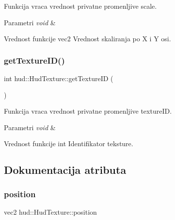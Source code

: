 Funkcija vraca vrednost privatne promenljive scale. 


\begin{DoxyParams}{Parametri}
{\em void} & \\
\hline
\end{DoxyParams}
\begin{DoxyReturn}{Vrednost funkcije}
vec2 Vrednost skaliranja po X i Y osi. 
\end{DoxyReturn}
\mbox{\label{classhud_1_1HudTexture_a2ac36167c1f0e18fdc9ea125fb909074}} 
\subsubsection{\texorpdfstring{get\+Texture\+I\+D()}{getTextureID()}}
{\footnotesize\ttfamily int hud\+::\+Hud\+Texture\+::get\+Texture\+ID (\begin{DoxyParamCaption}{ }\end{DoxyParamCaption})}



Funkcija vraca vrednost privatne promenljive texture\+ID. 


\begin{DoxyParams}{Parametri}
{\em void} & \\
\hline
\end{DoxyParams}
\begin{DoxyReturn}{Vrednost funkcije}
int Identifikator teksture. 
\end{DoxyReturn}


\subsection{Dokumentacija atributa}
\mbox{\label{classhud_1_1HudTexture_af4151cf971b1e2cafb4368bc58f224eb}} 
\subsubsection{\texorpdfstring{position}{position}}
{\footnotesize\ttfamily vec2 hud\+::\+Hud\+Texture\+::position\hspace{0.3cm}{\ttfamily [private]}}



